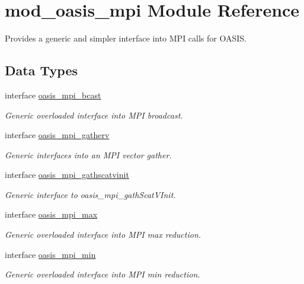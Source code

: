 \hypertarget{classmod__oasis__mpi}{\section{mod\+\_\+oasis\+\_\+mpi Module Reference}
\label{classmod__oasis__mpi}
}


Provides a generic and simpler interface into M\+P\+I calls for O\+A\+S\+I\+S.  


\subsection*{Data Types}
\begin{DoxyCompactItemize}
\item 
interface \hyperlink{interfacemod__oasis__mpi_1_1oasis__mpi__bcast}{oasis\+\_\+mpi\+\_\+bcast}
\begin{DoxyCompactList}\small\item\em Generic overloaded interface into M\+P\+I broadcast. \end{DoxyCompactList}\item 
interface \hyperlink{interfacemod__oasis__mpi_1_1oasis__mpi__gatherv}{oasis\+\_\+mpi\+\_\+gatherv}
\begin{DoxyCompactList}\small\item\em Generic interfaces into an M\+P\+I vector gather. \end{DoxyCompactList}\item 
interface \hyperlink{interfacemod__oasis__mpi_1_1oasis__mpi__gathscatvinit}{oasis\+\_\+mpi\+\_\+gathscatvinit}
\begin{DoxyCompactList}\small\item\em Generic interface to oasis\+\_\+mpi\+\_\+gath\+Scat\+V\+Init. \end{DoxyCompactList}\item 
interface \hyperlink{interfacemod__oasis__mpi_1_1oasis__mpi__max}{oasis\+\_\+mpi\+\_\+max}
\begin{DoxyCompactList}\small\item\em Generic overloaded interface into M\+P\+I max reduction. \end{DoxyCompactList}\item 
interface \hyperlink{interfacemod__oasis__mpi_1_1oasis__mpi__min}{oasis\+\_\+mpi\+\_\+min}
\begin{DoxyCompactList}\small\item\em Generic overloaded interface into M\+P\+I min reduction. \end{DoxyCompactList}\item 

\end{DoxyCompactItemize}
